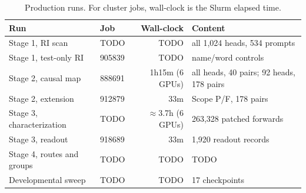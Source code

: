 \begin{table}[h]
\centering\scriptsize
\setlength{\tabcolsep}{3pt}
\begin{tabular}{@{}llrp{2.5cm}@{}}
\toprule
Run & Job & Wall-clock & Content \\
\midrule
Stage 1, RI scan & TODO & TODO & all 1,024 heads, 534 prompts \\
Stage 1, test-only RI & 905839 & TODO & name/word controls \\
Stage 2, causal map & 888691 & 1h15m (6 GPUs) & all heads, 40 pairs; 92 heads, 178 pairs \\
Stage 2, extension & 912879 & 33m & Scope P/F, 178 pairs \\
Stage 3, characterization & TODO & $\approx$3.7h (6 GPUs) & 263,328 patched forwards \\
Stage 3, readout & 918689 & 33m & 1,920 readout records \\
Stage 4, routes and groups & TODO & TODO & TODO \\
Developmental sweep & TODO & TODO & 17 checkpoints \\
\bottomrule
\end{tabular}
\caption{Production runs. For cluster jobs, wall-clock is the Slurm elapsed time.}
\label{tab:compute}
\end{table}
